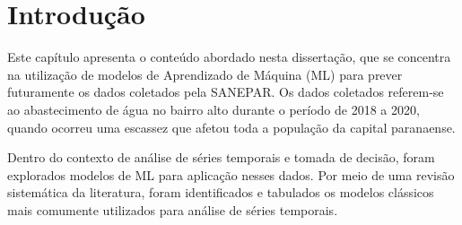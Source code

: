 

\section{Introdu{\c c}{\~a}o} \label{sec:int}

Este capítulo apresenta o conteúdo abordado nesta dissertação, que se concentra na utilização de modelos de Aprendizado de Máquina (ML) para prever futuramente os dados coletados pela SANEPAR. Os dados coletados referem-se ao abastecimento de água no bairro alto durante o período de 2018 a 2020, quando ocorreu uma escassez que afetou toda a população da capital paranaense.

Dentro do contexto de análise de séries temporais e tomada de decisão, foram explorados modelos de ML para aplicação nesses dados. Por meio de uma revisão sistemática da literatura, foram identificados e tabulados os modelos clássicos mais comumente utilizados para análise de séries temporais.



          

   

    

    

    